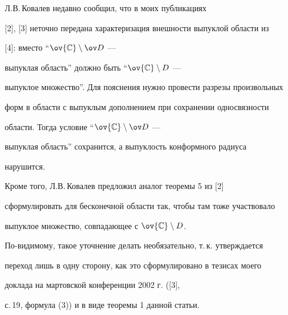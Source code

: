  


\begin{note} 


Л.В.\,Ковалев недавно сообщил, что в моих публикациях 


[2], [3] неточно передана характеризация внешности выпуклой области из 


[4]: вместо ``$\ov{\Bbb C}\setminus\ov D$ --- 


выпуклая область'' должно быть ``$\ov{\Bbb C}\setminus D$ --- 


выпуклое множество''. Для пояснения нужно провести разрезы произвольных 


форм в области с выпуклым дополнением при сохранении односвязности 


области. Тогда условие ``$\ov{\Bbb C}\setminus \ov D$ --- 


выпуклая область'' сохранится, а выпуклость конформного радиуса 


нарушится. 


 


Кроме того, Л.В.\,Ковалев предложил аналог теоремы 5 из [2] 


сформулировать для бесконечной области так, чтобы там тоже участвовало 


выпуклое множество, совпадающее с $\ov{\Bbb C}\setminus D$. 


По-видимому, такое уточнение делать необязательно, т.\,к. утверждается 


переход лишь в одну сторону, как это сформулировано в тезисах моего 


доклада на мартовской конференции 2002 г. ([3],  


с.\,19, формула (3)) и в виде теоремы 1 данной статьи. 


\end{note} 


 


